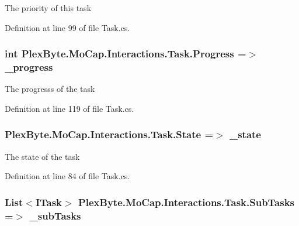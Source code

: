 The priority of this task 



Definition at line 99 of file Task.\+cs.

\subsubsection[{\texorpdfstring{Progress}{Progress}}]{\setlength{\rightskip}{0pt plus 5cm}int Plex\+Byte.\+Mo\+Cap.\+Interactions.\+Task.\+Progress =$>$ \+\_\+progress}\hypertarget{class_plex_byte_1_1_mo_cap_1_1_interactions_1_1_task_a557416cee8b3425c49f40fc07435719e}{}\label{class_plex_byte_1_1_mo_cap_1_1_interactions_1_1_task_a557416cee8b3425c49f40fc07435719e}


The progresss of the task 



Definition at line 119 of file Task.\+cs.

\subsubsection[{\texorpdfstring{State}{State}}]{ Plex\+Byte.\+Mo\+Cap.\+Interactions.\+Task.\+State =$>$ \+\_\+state}\hypertarget{class_plex_byte_1_1_mo_cap_1_1_interactions_1_1_task_ade847c2f68b897a4eae7463134aadaa1}{}\label{class_plex_byte_1_1_mo_cap_1_1_interactions_1_1_task_ade847c2f68b897a4eae7463134aadaa1}


The state of the task 



Definition at line 84 of file Task.\+cs.

\subsubsection[{\texorpdfstring{Sub\+Tasks}{SubTasks}}]{\setlength{\rightskip}{0pt plus 5cm}List$<${\bf I\+Task}$>$ Plex\+Byte.\+Mo\+Cap.\+Interactions.\+Task.\+Sub\+Tasks =$>$ \+\_\+sub\+Tasks}\hypertarget{class_plex_byte_1_1_mo_cap_1_1_interactions_1_1_task_adc2d20b794d9621f0f9496d753376a92}{}\label{class_plex_byte_1_1_mo_cap_1_1_interactions_1_1_task_adc2d20b794d9621f0f9496d753376a92}


